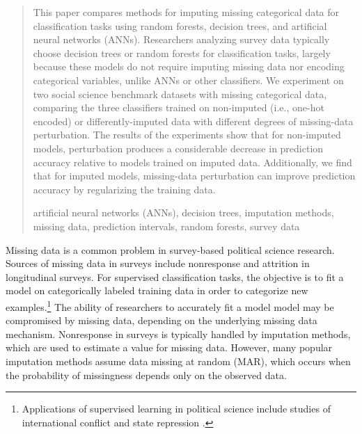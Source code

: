 \documentclass[10pt]{book}
\theoremstyle{definition}
\begin{document}
\begin{quotation}
This paper compares methods for imputing missing categorical data for classification tasks using random forests, decision trees, and artificial neural networks (ANNs). Researchers analyzing survey data typically choose decision trees or random forests for classification tasks, largely because these models do not require imputing missing data nor encoding categorical variables, unlike ANNs or other classifiers. We experiment on two social science benchmark datasets with missing categorical data, comparing the three classifiers trained on non-imputed (i.e., one-hot encoded) or differently-imputed data with different degrees of missing-data perturbation. The results of the experiments show that for non-imputed models, perturbation produces a considerable decrease in prediction accuracy relative to models trained on imputed data. Additionally, we find that for imputed models, missing-data perturbation can improve prediction accuracy by regularizing the training data. \par

\vspace{9pt}
artificial neural networks (ANNs), decision trees,  imputation methods, missing data,  prediction intervals, random forests, survey data
\par
\end{quotation}\par



\def\thefigure{\arabic{figure}}
\def\thetable{\arabic{table}}

\fontsize{12}{14pt plus.8pt minus .6pt}\selectfont

\newpage %

\setcounter{chapter}{1}
\setcounter{equation}{0} %

Missing data is a common problem in survey-based political science research. Sources of missing data in surveys include nonresponse and attrition in longitudinal surveys. For supervised classification tasks, the objective is to fit a model on categorically labeled training data in order to categorize new examples.\footnote{Applications of supervised learning in political science include studies of international conflict and state repression \citep{beck2000,de2004,hill2014}.} The ability of researchers to accurately fit a model model may be compromised by missing data, depending on the underlying missing data mechanism. Nonresponse in surveys is typically handled by imputation methods, which are used to estimate a value for missing data. However, many popular imputation methods assume data missing at random (MAR), which occurs when the probability of missingness depends only on the observed data. 
\end{document}
